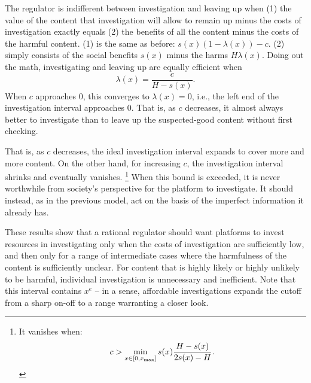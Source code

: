 The regulator is indifferent between investigation and leaving up when (1) the value of the content that investigation will allow to remain up minus the costs of investigation exactly equals (2) the benefits of all the content minus the costs of the harmful content. (1) is the same as before: $s(x)(1 - \lambda(x)) - c$. (2) simply consists of the social benefits $s(x)$ minus the harms $H\lambda(x)$. Doing out the math, investigating and leaving up are equally efficient when 
\begin{equation*}\lambda(x) = \frac{c}{H - s(x)}.\end{equation*} When $c$ approaches $0$, this converges to $\lambda(x) = 0$, i.e., the left end of the investigation interval approaches $0$. That is, as $c$ decreases, it almost always better to investigate than to leave up the suspected-good content without first checking. 

That is, as $c$ decreases, the ideal investigation interval expands to cover more and more content. On the other hand, for increasing $c$, the investigation interval shrinks and eventually vanishes. \footnote{It vanishes when:
\begin{equation*}
c > \min_{x \in [0, x_{\text{max}}]} s(x)\frac{H - s(x)}{2s(x) - H}.
\end{equation*}}
When this bound is exceeded, it is never worthwhile from society's perspective for the platform to investigate. It should instead, as in the previous model, act on the basis of the imperfect information it already has.

These results show that a rational regulator should want platforms to invest resources in investigating only when the costs of investigation are sufficiently low, and then only for a range of intermediate cases where the harmfulness of the content is sufficiently unclear. For content that is highly likely or highly unlikely to be harmful, individual investigation is unnecessary and inefficient. Note that this interval contains $x^e$ -- in a sense, affordable investigations expands the cutoff from a sharp on-off to a range warranting a closer look.

